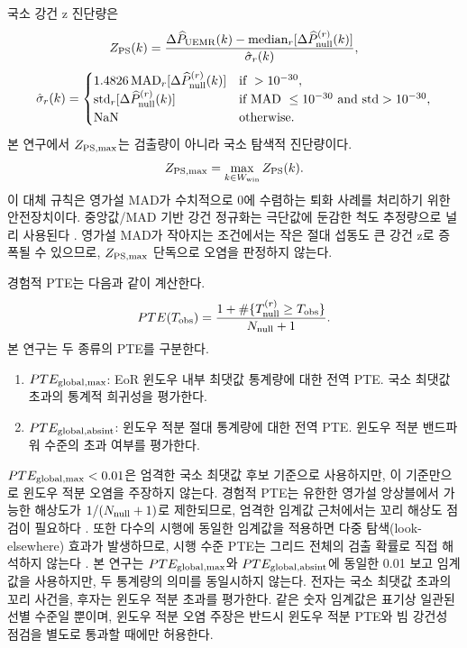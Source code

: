 \documentclass[final,5p,times]{elsarticle}
\newcommand{\RobustZEpsilon}{10^{-30}}
\begin{document}
국소 강건 z 진단량은
\begin{equation}
  Z_{\rm PS}(k)=
  \frac{
  \Delta\widehat{P}_{\rm UEMR}(k)
  -
  \mathrm{median}_{r}[\Delta\widehat{P}^{(r)}_{\rm null}(k)]
  }{
  \hat{\sigma}_{r}(k)
  },
\end{equation}
\begin{equation}
  \hat{\sigma}_{r}(k)=
  \begin{cases}
    1.4826\,\mathrm{MAD}_{r}[\Delta\widehat{P}^{(r)}_{\rm null}(k)] & \text{if } > \RobustZEpsilon, \\
    \mathrm{std}_{r}[\Delta\widehat{P}^{(r)}_{\rm null}(k)]          & \text{if MAD } \le \RobustZEpsilon \text{ and std} > \RobustZEpsilon, \\
    \mathrm{NaN}                                                       & \text{otherwise}.
  \end{cases}
\end{equation}
본 연구에서 $Z_{\rm PS,max}$는 검출량이 아니라 국소 탐색적 진단량이다.
\begin{equation}
  Z_{\rm PS,max}=\max_{k\in W_{\rm win}} Z_{\rm PS}(k).
\end{equation}
이 대체 규칙은 영가설 MAD가 수치적으로 0에 수렴하는 퇴화 사례를 처리하기 위한 안전장치이다.
중앙값/MAD 기반 강건 정규화는 극단값에 둔감한 척도 추정량으로 널리 사용된다 \citep{hampel1986,huber1981,rousseeuw1993}.
영가설 MAD가 작아지는 조건에서는 작은 절대 섭동도 큰 강건 z로 증폭될 수 있으므로,
$Z_{\rm PS,max}$ 단독으로 오염을 판정하지 않는다.

경험적 PTE는 다음과 같이 계산한다.
\begin{equation}
  PTE(T_{\rm obs})
  =
  \frac{1+\#\{T_{\rm null}^{(r)}\ge T_{\rm obs}\}}{N_{\rm null}+1}.
\end{equation}
본 연구는 두 종류의 PTE를 구분한다.
\begin{enumerate}
  \item $PTE_{\rm global,max}$: EoR 윈도우 내부 최댓값 통계량에 대한 전역 PTE. 국소 최댓값 초과의 통계적 희귀성을 평가한다.
  \item $PTE_{\rm global,absint}$: 윈도우 적분 절대 통계량에 대한 전역 PTE. 윈도우 적분 밴드파워 수준의 초과 여부를 평가한다.
\end{enumerate}
$PTE_{\rm global,max}<0.01$은 엄격한 국소 최댓값 후보 기준으로 사용하지만, 이 기준만으로
윈도우 적분 오염을 주장하지 않는다. 경험적 PTE는 유한한 영가설 앙상블에서 가능한 해상도가
$1/(N_{\rm null}+1)$로 제한되므로, 엄격한 임계값 근처에서는 꼬리 해상도 점검이 필요하다
\citep{davison1997,north2002}. 또한 다수의 시행에 동일한 임계값을 적용하면 다중 탐색(look-elsewhere) 효과가 발생하므로,
시행 수준 PTE는 그리드 전체의 검출 확률로 직접 해석하지 않는다 \citep{westfall1993}.
본 연구는 $PTE_{\rm global,max}$와 $PTE_{\rm global,absint}$에 동일한 0.01 보고 임계값을 사용하지만,
두 통계량의 의미를 동일시하지 않는다. 전자는 국소 최댓값 초과의 꼬리 사건을, 후자는 윈도우 적분
초과를 평가한다. 같은 숫자 임계값은 표기상 일관된 선별 수준일 뿐이며, 윈도우 적분 오염 주장은
반드시 윈도우 적분 PTE와 빔 강건성 점검을 별도로 통과할 때에만 허용한다.
\end{document}
